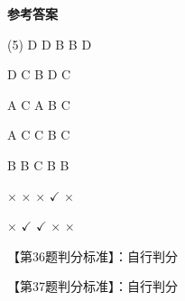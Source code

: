\documentclass[11pt, a4paper]{article}
\begin{document}
\begin{center}
    \Huge \textbf{参考答案}
\end{center}

    \begin{tasks}[label=\arabic*. , label-width=14pt](5)
        \task D
        \task D
        \task B
        \task B
        \task D

        \task D
        \task C
        \task B
        \task D
        \task C

        \task A
        \task C
        \task A
        \task B
        \task C

        \task A
        \task C
        \task C
        \task B
        \task C

        \task B
        \task B
        \task C
        \task B
        \task B

        \task $\times$
        \task $\times$
        \task $\times$
        \task $\checkmark$
        \task $\times$

        \task $\times$
        \task $\checkmark$
        \task $\checkmark$
        \task $\times$
        \task $\times$
    \end{tasks}

    【第36题判分标准】：自行判分

    【第37题判分标准】：自行判分
\end{document}
